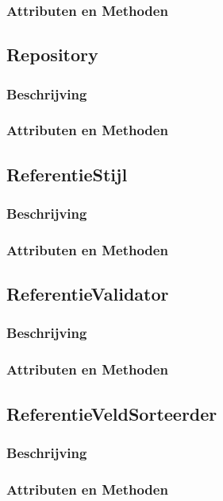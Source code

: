 \documentclass[a4paper]{article}
\begin{document}
\subsubsection{Attributen en Methoden}

\subsection{Repository}
\subsubsection{Beschrijving}
\subsubsection{Attributen en Methoden}

\subsection{ReferentieStijl}
\subsubsection{Beschrijving}
\subsubsection{Attributen en Methoden}

\subsection{ReferentieValidator}
\subsubsection{Beschrijving}
\subsubsection{Attributen en Methoden}

\subsection{ReferentieVeldSorteerder}
\subsubsection{Beschrijving}
\subsubsection{Attributen en Methoden}
\end{document}
